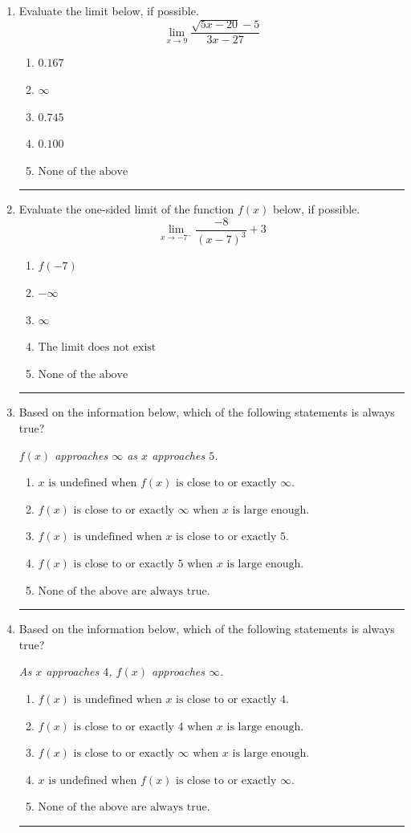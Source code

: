 \documentclass[14pt]{extbook}
\newcommand{\litem}[1]{\item#1\hspace*{-1cm}\rule{\textwidth}{0.4pt}}
\begin{document}
\begin{enumerate}
\litem{
Evaluate the limit below, if possible.\[ \lim_{x \rightarrow 9} \frac{\sqrt{5x - 20} - 5}{3x - 27} \]\begin{enumerate}[label=\Alph*.]
\item \( 0.167 \)
\item \( \infty \)
\item \( 0.745 \)
\item \( 0.100 \)
\item \( \text{None of the above} \)

\end{enumerate} }
\litem{
Evaluate the one-sided limit of the function $f(x)$ below, if possible.\[ \lim_{x \rightarrow -7^-} \frac{-8}{(x-7)^3}+3 \]\begin{enumerate}[label=\Alph*.]
\item \( f(-7) \)
\item \( -\infty \)
\item \( \infty \)
\item \( \text{The limit does not exist} \)
\item \( \text{None of the above} \)

\end{enumerate} }
\litem{
Based on the information below, which of the following statements is always true?
\begin{center}
    \textit{ $f(x)$ approaches $\infty$ as $x$ approaches $5$. }
\end{center}
\begin{enumerate}[label=\Alph*.]
\item \( x \text{ is undefined when } f(x) \text{ is close to or exactly } \infty. \)
\item \( f(x) \text{ is close to or exactly } \infty \text{ when } x \text{ is large enough}. \)
\item \( f(x) \text{ is undefined when } x \text{ is close to or exactly } 5. \)
\item \( f(x) \text{ is close to or exactly } 5 \text{ when } x \text{ is large enough}. \)
\item \( \text{None of the above are always true.} \)

\end{enumerate} }
\litem{
Based on the information below, which of the following statements is always true?
\begin{center}
    \textit{ As $x$ approaches $4$, $f(x)$ approaches $\infty$. }
\end{center}
\begin{enumerate}[label=\Alph*.]
\item \( f(x) \text{ is undefined when } x \text{ is close to or exactly } 4. \)
\item \( f(x) \text{ is close to or exactly } 4 \text{ when } x \text{ is large enough}. \)
\item \( f(x) \text{ is close to or exactly } \infty \text{ when } x \text{ is large enough}. \)
\item \( x \text{ is undefined when } f(x) \text{ is close to or exactly } \infty. \)
\item \( \text{None of the above are always true.} \)


\end{enumerate}}
\end{enumerate}
\end{document}
